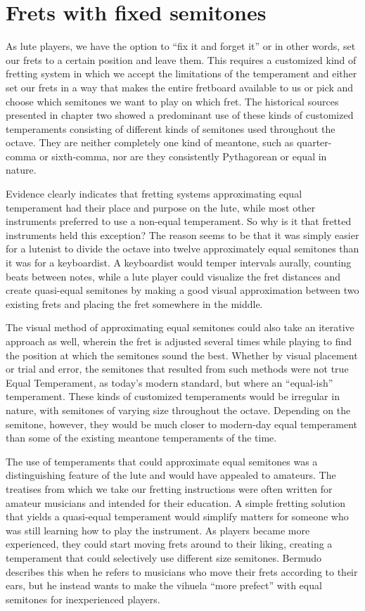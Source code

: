 \section{Frets with fixed semitones}

As lute players, we have the option to ``fix it and forget it'' or in other words, set
our frets to a certain position and leave them. This requires a customized kind of
fretting system in which we accept the limitations of the temperament and either set
our frets in a way that makes the entire fretboard available to us or pick and choose
which semitones we want to play on which fret. The historical sources presented in
chapter two showed a predominant use of these kinds of customized temperaments
consisting of different kinds of semitones used throughout the octave. They are neither
completely one kind of meantone, such as quarter-comma or sixth-comma, nor are they
consistently Pythagorean or equal in nature.

Evidence clearly indicates that fretting systems approximating equal temperament had
their place and purpose on the lute, while most other instruments preferred to use a
non-equal temperament.  So why is it that fretted instruments held this exception? The
reason seems to be that it was simply easier for a lutenist to divide the octave into
twelve approximately equal semitones than it was for a keyboardist. A keyboardist would
temper intervals aurally, counting beats between notes, while a lute player could
visualize the fret distances and create quasi-equal semitones by making a good
visual approximation between two existing frets and placing the fret somewhere in the
middle.

The visual method of approximating equal semitones could also take an iterative approach as well,
wherein the fret is adjusted several times while playing to find the position at which the semitones
sound the best. Whether by visual placement or trial and error, the semitones that resulted from
such methods were not true Equal Temperament, as today's modern standard, but where an ``equal-ish''
temperament. These kinds of customized temperaments would be irregular in nature, with semitones of
varying size throughout the octave.  Depending on the semitone, however, they would be much closer
to modern-day equal temperament than some of the existing meantone temperaments of the time.

The use of temperaments that could approximate equal semitones was a distinguishing
feature of the lute and would have appealed to amateurs. The treatises from which we
take our fretting instructions were often written for amateur musicians and intended
for their education. A simple fretting solution that yields a quasi-equal temperament
would simplify matters for someone who was still learning how to play the instrument.
As players became more experienced, they could start moving frets around to their
liking, creating a temperament that could selectively use different size
semitones. Bermudo describes this when he refers to musicians who move their
frets according to their ears, but he instead wants to make the vihuela ``more
prefect'' with equal semitones for inexperienced players.\autocite[78]{DE:1}

